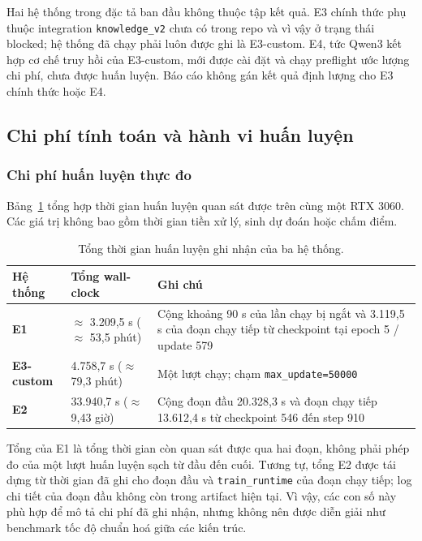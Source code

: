 Hai hệ thống trong đặc tả ban đầu không thuộc tập kết quả. E3 chính thức phụ
thuộc integration \texttt{knowledge\_v2} chưa có trong repo và vì vậy ở trạng
thái blocked; hệ thống đã chạy phải luôn được ghi là E3-custom. E4, tức Qwen3
kết hợp cơ chế truy hồi của E3-custom, mới được cài đặt và chạy preflight ước
lượng chi phí, chưa được huấn luyện. Báo cáo không gán kết quả định lượng cho
E3 chính thức hoặc E4.


\subsection{Chi phí tính toán và hành vi huấn luyện}

\subsubsection{Chi phí huấn luyện thực đo}

Bảng~\ref{tab:wallclock} tổng hợp thời gian huấn luyện quan sát được trên cùng
một RTX 3060. Các giá trị không bao gồm thời gian tiền xử lý, sinh dự đoán hoặc
chấm điểm.

\begin{table}[tbp]
  \centering
  \small
  \renewcommand{\arraystretch}{1.18}
  \caption{Tổng thời gian huấn luyện ghi nhận của ba hệ thống.}
  \label{tab:wallclock}
  \begin{tabularx}{\textwidth}{@{}>{\bfseries}p{3.4cm}p{3.1cm}X@{}}
    \toprule
    Hệ thống & Tổng wall-clock & Ghi chú \\
    \midrule
    E1
      & $\approx$ 3.209,5 s ($\approx$ 53,5 phút)
      & Cộng khoảng 90 s của lần chạy bị ngắt và 3.119,5 s của đoạn chạy tiếp
        từ checkpoint tại epoch 5 / update 579 \\
    E3-custom
      & 4.758,7 s ($\approx$ 79,3 phút)
      & Một lượt chạy; chạm \texttt{max\_update=50000} \\
    E2
      & 33.940,7 s ($\approx$ 9,43 giờ)
      & Cộng đoạn đầu 20.328,3 s và đoạn chạy tiếp 13.612,4 s từ checkpoint
        546 đến step 910 \\
    \bottomrule
  \end{tabularx}
\end{table}

Tổng của E1 là tổng thời gian còn quan sát được qua hai đoạn, không phải phép đo
của một lượt huấn luyện sạch từ đầu đến cuối. Tương tự, tổng E2 được tái dựng
từ thời gian đã ghi cho đoạn đầu và \texttt{train\_runtime} của đoạn chạy tiếp;
log chi tiết của đoạn đầu không còn trong artifact hiện tại. Vì vậy, các con số
này phù hợp để mô tả chi phí đã ghi nhận, nhưng không nên được diễn giải như
benchmark tốc độ chuẩn hoá giữa các kiến trúc.

